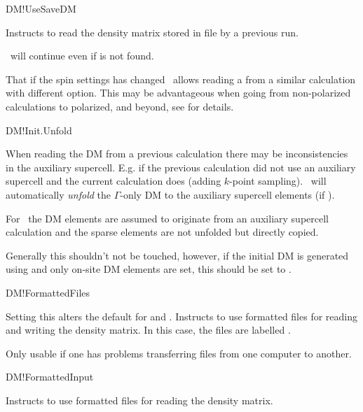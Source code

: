 \begin{fdflogicalF}{DM!UseSaveDM}
  
  Instructs to read the density matrix stored in file
   by a previous run.
  
  \siesta\ will continue even if  is not found.

  \note That if the spin settings has changed \siesta\ allows reading
  a  from a similar calculation with different 
  option. This may be advantageous when going from non-polarized
  calculations to polarized, and beyond, see  for details. 

\end{fdflogicalF}

\begin{fdflogicalT}{DM!Init.Unfold}

  When reading the DM from a previous calculation there may be
  inconsistencies in the auxiliary supercell. E.g. if the previous
  calculation did not use an auxiliary supercell and the current
  calculation does (adding $k$-point sampling). \siesta\ will
  automatically \emph{unfold} the $\Gamma$-only DM to the auxiliary
  supercell elements (if \fdftrue).

  For \fdffalse\ the DM elements are assumed to originate from an
  auxiliary supercell calculation and the sparse elements are not
  unfolded but directly copied.

  \note Generally this shouldn't not be touched, however, if the
  initial DM is generated using \sisl\cite{sisl} and only on-site DM
  elements are set, this should be set to \fdffalse.

\end{fdflogicalT}

\begin{fdflogicalF}{DM!FormattedFiles}

  Setting this alters the default for  and 
  .
  Instructs to use formatted files for reading and writing
  the density matrix. In this case, the files are labelled
  .
  
  Only usable if one has problems transferring files from one computer
  to another.

\end{fdflogicalF}

\begin{fdflogicalF}{DM!FormattedInput}

  Instructs to use formatted files for reading the density
  matrix.
  
\end{fdflogicalF}

